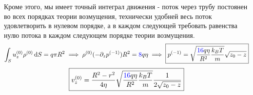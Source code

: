 \documentclass[a4paper,12pt]{article}
\theoremstyle{plain} %
\theoremstyle{definition} %
\theoremstyle{remark} %
\begin{document}
Кроме этого, мы имеет точный интеграл движения - поток через трубу постоянен во всех порядках теории возмущения, технически удобней весь поток удовлетворить в нулевом порядке, а в каждом следующей требовать равенства нулю потока в каждом следующем порядке теории возмущения.
\begin{equation}
    \int_S u_z^{(0)} \rho^{(0)} \dd{S} = q \pi R^2 \implies \rho^{(0)} (-\partial_z p^{(-1)}) R^2 = \textcolor{blue}{8}q\eta \implies \boxed{p^{(-1)} = \sqrt{\frac{\textcolor{blue}{16}q\eta}{R^2}\frac{k_B T}{m}}\sqrt{z_0-z}}
\end{equation}
\begin{equation}\boxed{
    v_z^{(0)} = \frac{R^2-r^2}{4\eta} \sqrt{\frac{\textcolor{blue}{16}q\eta}{R^2}\frac{k_B T}{m}}\frac{1}{2\sqrt{z_0-z}} 
}\end{equation}
\end{document}
